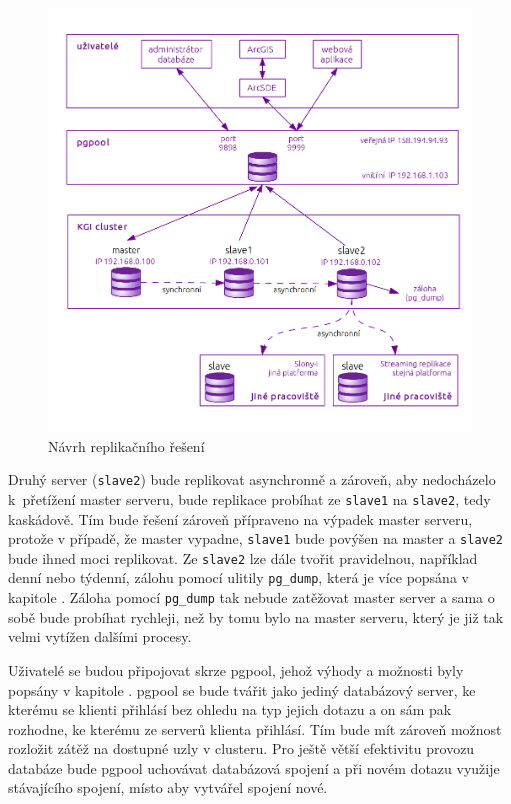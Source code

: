       \begin{figure}[H]
        \label{oNavrhKatedra}
        \centering
        \includegraphics[scale=1]{../../../grafy/obr/schema_navrhKatedra.png}
        \caption {Návrh replikačního řešení}
      \end{figure}

      Druhý server (\texttt{slave2}) bude replikovat asynchronně a zároveň, aby nedocházelo k~přetížení master serveru, bude replikace probíhat ze \texttt{slave1} na \texttt{slave2}, tedy kaskádově. Tím bude řešení zároveň přípraveno na výpadek master serveru, protože v případě, že master vypadne, \texttt{slave1} bude povýšen na master a \texttt{slave2} bude ihned moci replikovat. Ze \texttt{slave2} lze dále tvořit pravidelnou, například denní nebo týdenní, zálohu pomocí ulitily \texttt{pg\_dump}, která je více popsána v kapitole . Záloha pomocí \texttt{pg\_dump} tak nebude zatěžovat master server a sama o sobě bude probíhat rychleji, než by tomu bylo na master serveru, který je již tak velmi vytížen dalšími procesy.

Uživatelé se budou připojovat skrze pgpool, jehož výhody a možnosti byly popsány v kapitole . pgpool se bude tvářit jako jediný databázový server, ke kterému se klienti přihlásí bez ohledu na typ jejich dotazu a on sám pak rozhodne, ke kterému ze serverů klienta přihlásí. Tím bude mít zároveň možnost rozložit zátěž na dostupné uzly v clusteru. Pro ještě větší efektivitu provozu databáze bude pgpool uchovávat databázová spojení a při novém dotazu využije stávajícího spojení, místo aby vytvářel spojení nové. 


